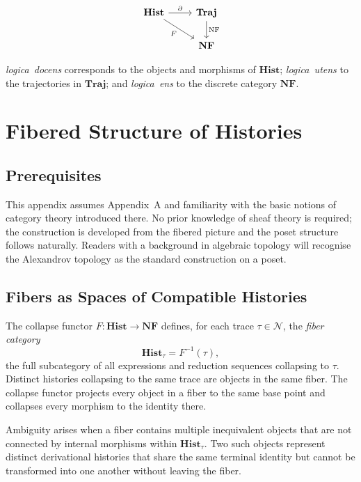 \documentclass[12pt, oneside]{amsbook}
\theoremstyle{plain}
\theoremstyle{definition}
\theoremstyle{remark}
\newcommand{\NF}{\mathcal{N}}
\newcommand{\eventword}{\partial}
\newcommand{\docens}{\textit{logica~docens}}
\newcommand{\utens}{\textit{logica~utens}}
\newcommand{\ens}{\textit{logica~ens}}
\begin{document}
\[
  \begin{tikzcd}
    \mathbf{Hist}
      \arrow[r, "\eventword"]
      \arrow[dr, "F"'] &
    \mathbf{Traj}
      \arrow[d, "\operatorname{NF}"] \\
    & \mathbf{NF}
  \end{tikzcd}
\]

\docens{} corresponds to the objects and morphisms of $\mathbf{Hist}$;
\utens{} to the trajectories in $\mathbf{Traj}$; and \ens{} to the discrete
category $\mathbf{NF}$.


\chapter{Fibered Structure of Histories}
\label{app:fibered}

\section{Prerequisites}

This appendix assumes Appendix~A and familiarity with the basic notions of
category theory introduced there. No prior knowledge of sheaf theory is
required; the construction is developed from the fibered picture and the
poset structure follows naturally. Readers with a background in algebraic
topology will recognise the Alexandrov topology as the standard construction
on a poset.

\section{Fibers as Spaces of Compatible Histories}

The collapse functor $F : \mathbf{Hist} \to \mathbf{NF}$ defines, for each
trace $\tau \in \NF$, the \emph{fiber category}
\[
  \mathbf{Hist}_\tau = F^{-1}(\tau),
\]
the full subcategory of all expressions and reduction sequences collapsing
to $\tau$. Distinct histories collapsing to the same trace are objects in the
same fiber. The collapse functor projects every object in a fiber to the same
base point and collapses every morphism to the identity there.

Ambiguity arises when a fiber contains multiple inequivalent objects that are
not connected by internal morphisms within $\mathbf{Hist}_\tau$. Two such
objects represent distinct derivational histories that share the same terminal
identity but cannot be transformed into one another without leaving the fiber.
\end{document}
